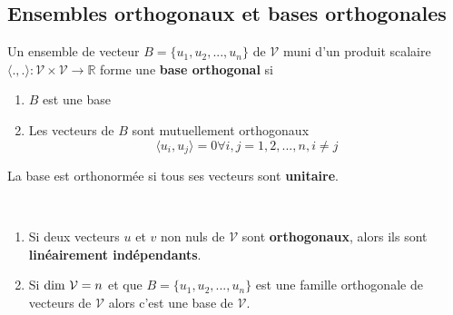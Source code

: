 	\subsection{Ensembles orthogonaux et bases orthogonales}
		\begin{mydef}
			Un ensemble de vecteur $B=\{u_1,u_2,...,u_n\}$ de $\mathcal{V}$ muni d'un produit scalaire $\langle .,.\rangle:\mathcal{V}\times\mathcal{V}\longrightarrow\mathbb{R}$ forme une \textbf{base orthogonal} si 
			\begin{enumerate}
				\item $B$ est une base
				\item Les vecteurs de $B$ sont mutuellement orthogonaux\[\langle u_i,u_j\rangle=0 \forall i,j=1,2,...,n, i\neq j\]
			\end{enumerate}
		La base est orthonormée si tous ses vecteurs sont \textbf{unitaire}.
		\end{mydef}
		\begin{myprop}
			~
			\begin{enumerate}
				\item Si deux vecteurs $u$ et $v$ non nuls de $\mathcal{V}$ sont \textbf{orthogonaux}, alors ils sont \textbf{linéairement indépendants}.
				\item Si $\text{\normalfont{dim}} \ \mathcal{V}=n$ et que $B=\{u_1,u_2,...,u_n\}$ est une famille orthogonale de vecteurs de $\mathcal{V}$ alors c'est une base de $\mathcal{V}$.
			\end{enumerate}
		\end{myprop}

